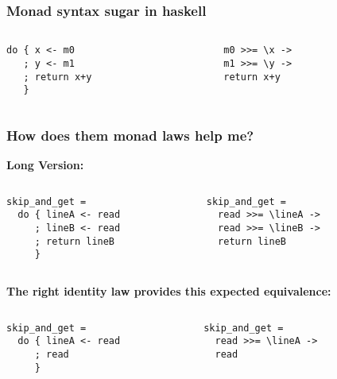 \documentclass{beamer}
\begin{document}
\begin{frame}[fragile]
\frametitle{Monad syntax sugar in haskell}
\begin{columns}[t]
  \begin{column}{5cm}
\begin{lstlisting}
do { x <- m0
   ; y <- m1
   ; return x+y
   }
\end{lstlisting}
  \end{column}
  \begin{column}{5cm}
\begin{lstlisting}
    m0 >>= \x ->    
    m1 >>= \y ->    
    return x+y
\end{lstlisting}
  \end{column}
\end{columns}

\end{frame}
\begin{frame}[fragile]
\frametitle{How does them monad laws help me?}		
\textbf{Long Version:}
\vspace{-0.5cm}
\begin{columns}[t]
  \begin{column}{5cm}
\begin{lstlisting}
skip_and_get = 
  do { lineA <- read
     ; lineB <- read 
     ; return lineB 
     }
\end{lstlisting}
  \end{column}
  \begin{column}{5cm}
\begin{lstlisting}
skip_and_get =
  read >>= \lineA ->    
  read >>= \lineB ->    
  return lineB
\end{lstlisting}
  \end{column}
\end{columns}
\pause
\textbf{The right identity law provides this expected equivalence:} 
\vspace{-0.5cm}
\begin{columns}[t]
  \begin{column}{5cm}
\begin{lstlisting}
skip_and_get = 
  do { lineA <- read
     ; read
     }
\end{lstlisting}
  \end{column}
  \begin{column}{5cm}
\begin{lstlisting}
skip_and_get =
  read >>= \lineA ->    
  read
\end{lstlisting}
  \end{column}
\end{columns}



\end{frame}
\end{document}
